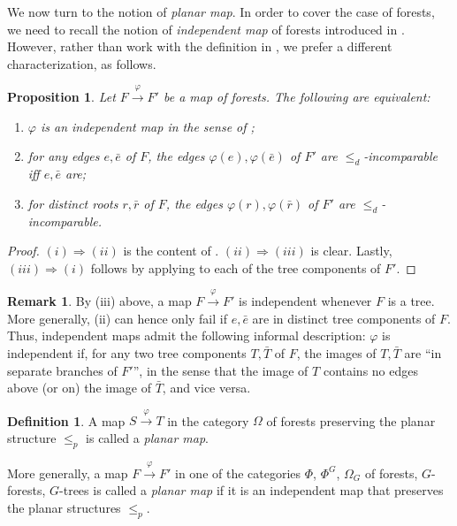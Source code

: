 \documentclass[a4paper,10pt
,draft
]{article}%
\numberwithin{equation}{section}
\numberwithin{figure}{section}
\newtheorem{proposition}[equation]{Proposition}%
\theoremstyle{definition} %
\newtheorem{definition}[equation]{Definition}%
\newtheorem{remark}[equation]{Remark}%
\newcommand{\1}{\ensuremath{\mathbbm 1}}%
\begin{document}
We now turn to the notion of \emph{planar map}.
In order to cover the case of forests, 
we need to recall
the notion of \emph{independent map} of forests
introduced in \cite[Def. 5.28]{Pe17}.
However, rather than work with the definition in 
\cite{Pe17}, we prefer a different characterization, as follows.

\begin{proposition}\label{INDMAPCHAR PROP}
	Let $F \xrightarrow{\varphi} F'$ be a map of forests.
	The following are equivalent:
\begin{enumerate}
	\item[(i)] $\varphi$ is an independent map in the sense of
	\cite[Def. 5.28]{Pe17};
	\item[(ii)] for any edges $e,\bar{e}$ of $F$,
	the edges
	$\varphi(e),\varphi(\bar{e})$ of $F'$
	are $\leq_d$-incomparable iff 
	$e,\bar{e}$ are;
	\item[(iii)] for distinct roots $r,\bar{r}$ of $F$,
	the edges
	$\varphi(r),\varphi(\bar{r})$ of $F'$
	are $\leq_d$-incomparable.
\end{enumerate}
\end{proposition}

\begin{proof}
	$(i) \Rightarrow (ii)$
	is the content of \cite[Lemma 5.32]{Pe17}.
	$(ii) \Rightarrow (iii)$ is clear.
	Lastly, 
	$(iii) \Rightarrow (i)$ follows by applying 
	\cite[Lemma 5.24]{Pe17} to each of the tree components of $F'$.
\end{proof}


\begin{remark}
	By (iii) above,
	a map $F \xrightarrow{\varphi} F'$ is independent whenever $F$ is a tree. 
	More generally, (ii) can hence only fail
	if $e,\bar{e}$ are in distinct tree components of $F$.
	Thus, independent maps admit the following informal description:
	$\varphi$ is independent if, for any two tree components
	$T,\bar{T}$ of $F$,
	the images of $T,\bar{T}$ are ``in separate branches of $F'$'',
	in the sense that the image of $T$ contains no edges above (or on) the image of $\bar{T}$, and vice versa.
\end{remark}


\begin{definition}\label{PLANARMAP_DEF}
	A map $S \xrightarrow{\varphi} T$ in the category $\Omega$ of forests preserving the planar structure $\leq_p$
	is called a \textit{planar map}.
	
	More generally, a map $F \xrightarrow{\varphi} F'$ in one of the categories $\Phi$, $\Phi^G$, $\Omega_G$ of forests, $G$-forests, $G$-trees is called a \textit{planar map} if it is an independent map that preserves the planar structures $\leq_p$.
\end{definition}
\end{document}
